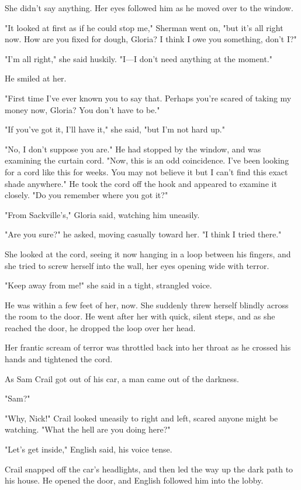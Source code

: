 \documentclass{novel}
\begin{document}
She didn't say anything. Her eyes followed him as he moved over to the window.

"It looked at first as if he could stop me," Sherman went on, "but it's all right now. How are you fixed for dough, Gloria? I think I owe you something, don't I?"

"I'm all right," she said huskily. "I—I don't need anything at the moment."

He smiled at her.

"First time I've ever known you to say that. Perhaps you're scared of taking my money now, Gloria? You don't have to be."

"If you've got it, I'll have it," she said, "but I'm not hard up."

"No, I don't suppose you are." He had stopped by the window, and was examining the curtain cord. "Now, this is an odd coincidence. I've been looking for a cord like this for weeks. You may not believe it but I can't find this exact shade anywhere." He took the cord off the hook and appeared to examine it closely. "Do you remember where you got it?"

"From Sackville's," Gloria said, watching him uneasily.

"Are you sure?" he asked, moving casually toward her. "I think I tried there."

She looked at the cord, seeing it now hanging in a loop between his fingers, and she tried to screw herself into the wall, her eyes opening wide with terror.

"Keep away from me!" she said in a tight, strangled voice.

He was within a few feet of her, now. She suddenly threw herself blindly across the room to the door. He went after her with quick, silent steps, and as she reached the door, he dropped the loop over her head.

Her frantic scream of terror was throttled back into her throat as he crossed his hands and tightened the cord.

As Sam Crail got out of his car, a man came out of the darkness.

"Sam?"

"Why, Nick!" Crail looked uneasily to right and left, scared anyone might be watching. "What the hell are you doing here?"

"Let's get inside," English said, his voice tense.

Crail snapped off the car's headlights, and then led the way up the dark path to his house. He opened the door, and English followed him into the lobby.
\end{document}
